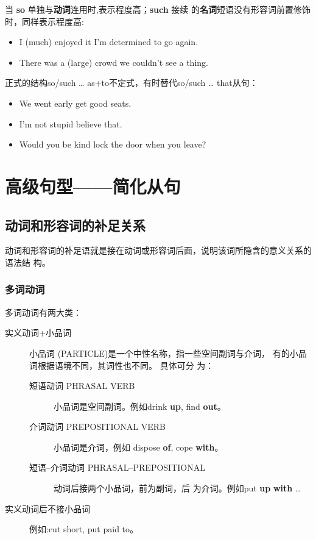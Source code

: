 当 \textbf{so} 单独与\textbf{动词}连用时,表示程度高；\textbf{such} 接续
的\textbf{名词}短语没有形容词前置修饰时，同样表示程度高:
\begin{itemize}
\item I  (much) enjoyed it  I'm determined to go
  again.
\item There was  a (large) crowd  we couldn't see a thing.
\end{itemize}

正式的结构so/such \ldots{} as+to不定式，有时替代so/such \ldots{} that从句：
\begin{itemize}
\item  We went early  get good seats.

\item I'm not  stupid  believe that.

\item Would you be  kind  lock the door when you leave?
\end{itemize}


\part{高级句型——简化从句}

\chapter{动词和形容词的补足关系}

动词和形容词的补足语就是接在动词或形容词后面，说明该词所隐含的意义关系的语法结
构。

\section{多词动词}

多词动词有两大类：
\begin{description}
\item[实义动词+小品词] 小品词 (PARTICLE)是一个中性名称，指一些空间副词与介词，
  有的小品词根据语境不同，其词性也不同。 具体可分
  为：
  \begin{description}
  \item[短语动词 PHRASAL VERB] 小品词是空间副词。例如drink \textbf{up}, find
    \textbf{out}。

  \item[介词动词 PREPOSITIONAL VERB] 小品词是介词，例如 dispose \textbf{of},
    cope \textbf{with}。

  \item[短语--介词动词 PHRASAL--PREPOSITIONAL] 动词后接两个小品词，前为副词，后
    为介词。例如put
    \textbf{up} \textbf{with} \ldots{}
  \end{description}

\item[实义动词后不接小品词] 例如:cut short, put paid to。

\end{description}

